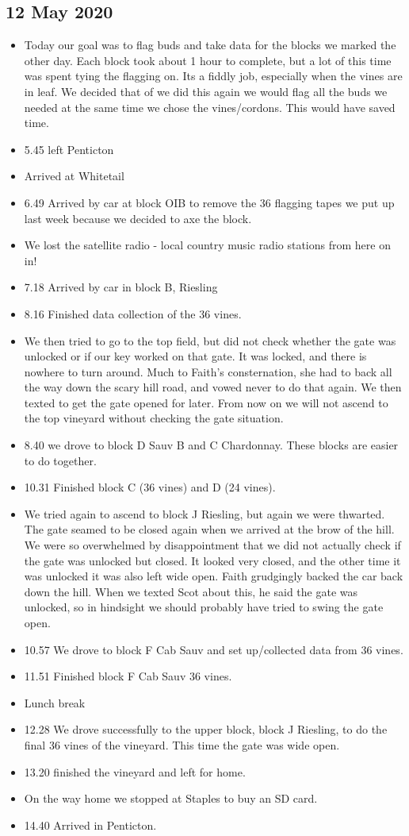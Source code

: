 \documentclass[11pt,letter]{article}
\newenvironment{smitemize}{
\begin{itemize}
  \setlength{\itemsep}{0pt}
  \setlength{\parskip}{0.8pt}
  \setlength{\parsep}{0pt}}
{\end{itemize}
}
\begin{document}
\subsection {12 May 2020}
\begin{smitemize}
\item Today our goal was to flag buds and take data for the blocks we marked the other day. Each block took about 1 hour to complete, but a lot of this time was spent tying the flagging on. Its a fiddly job, especially when the vines are in leaf. We decided that of we did this again we would flag all the buds we needed at the same time we chose the vines/cordons. This would have saved time.
\item 5.45 left Penticton 
\item Arrived at Whitetail 
\item 6.49 Arrived by car at block OIB to remove the 36 flagging tapes we put up last week because we decided to axe the block.
\item We lost the satellite radio - local country music radio stations from here on in!
\item 7.18 Arrived by car in block B, Riesling 
\item 8.16 Finished data collection of the 36 vines. 
\item We then tried to go to the top field, but did not check whether the gate was unlocked or if our key worked on that gate. It was locked, and there is nowhere to turn around. Much to Faith's consternation, she had to back all the way down the scary hill road, and vowed never to do that again. We then texted to get the gate opened for later. From now on we will not ascend to the top vineyard without checking the gate situation. 
\item 8.40 we drove to block D Sauv B and C Chardonnay. These blocks are easier to do together.
\item 10.31 Finished block C (36 vines) and D (24 vines).
\item We tried again to ascend to block J Riesling, but again we were thwarted. The gate seamed to be closed again when we arrived at the brow of the hill. We were so overwhelmed by disappointment that we did not actually check if the gate was unlocked but closed. It looked very closed, and the other time it was unlocked it was also left wide open. Faith grudgingly backed the car back down the hill. When we texted Scot about this, he said the gate was unlocked, so in hindsight we should probably have tried to swing the gate open.   
\item 10.57 We drove to block F Cab Sauv and set up/collected data from 36 vines.
\item 11.51 Finished block F Cab Sauv 36 vines. 
\item Lunch break
\item 12.28 We drove successfully to the upper block, block J Riesling, to do the final 36 vines of the vineyard. This time the gate was wide open. 
\item 13.20 finished the vineyard and left for home. 
\item On the way home we stopped at Staples to buy an SD card.
\item 14.40 Arrived in Penticton.  


\end{smitemize}
\end{document}
